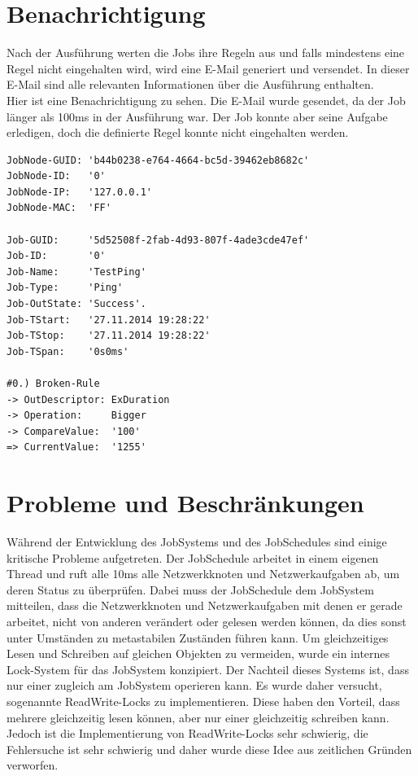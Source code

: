\documentclass[12pt,a4paper]{report}
\begin{document}
\begin{onehalfspace}
\section{Benachrichtigung}

Nach der Ausführung werten die Jobs ihre Regeln aus und falls mindestens eine Regel nicht eingehalten wird, wird eine E-Mail generiert und versendet. In dieser E-Mail sind alle relevanten Informationen über die Ausführung enthalten.\\ 
Hier ist eine Benachrichtigung zu sehen. Die E-Mail wurde gesendet, da der Job länger als 100ms in der Ausführung war. Der Job konnte aber seine Aufgabe erledigen, doch die definierte Regel konnte nicht eingehalten werden.\\

\begin{lstlisting}
JobNode-GUID: 'b44b0238-e764-4664-bc5d-39462eb8682c'
JobNode-ID:   '0'
JobNode-IP:   '127.0.0.1'
JobNode-MAC:  'FF'

Job-GUID:     '5d52508f-2fab-4d93-807f-4ade3cde47ef'
Job-ID:       '0'
Job-Name:     'TestPing'
Job-Type:     'Ping'
Job-OutState: 'Success'.
Job-TStart:   '27.11.2014 19:28:22'
Job-TStop:    '27.11.2014 19:28:22'
Job-TSpan:    '0s0ms'

#0.) Broken-Rule
-> OutDescriptor: ExDuration
-> Operation:     Bigger
-> CompareValue:  '100'
=> CurrentValue:  '1255'
\end{lstlisting}

\newpage
\section{Probleme und Beschränkungen}

Während der Entwicklung des JobSystems und des JobSchedules sind einige kritische Probleme aufgetreten. Der JobSchedule arbeitet in einem eigenen Thread und ruft alle 10ms alle Netzwerkknoten und Netzwerkaufgaben ab, um deren Status zu überprüfen. Dabei muss der JobSchedule dem JobSystem mitteilen, dass die Netzwerkknoten und Netzwerkaufgaben mit denen er gerade arbeitet, nicht von anderen verändert oder gelesen werden können, da dies sonst unter Umständen zu metastabilen Zuständen führen kann. Um gleichzeitiges Lesen und Schreiben auf gleichen Objekten zu vermeiden, wurde ein internes Lock-System für das JobSystem konzipiert. Der Nachteil dieses Systems ist, dass nur einer zugleich am JobSystem operieren kann. Es wurde daher versucht, sogenannte ReadWrite-Locks zu implementieren. Diese haben den Vorteil, dass mehrere gleichzeitig lesen können, aber nur einer gleichzeitig schreiben kann. Jedoch ist die Implementierung von ReadWrite-Locks sehr schwierig, die Fehlersuche ist sehr schwierig und daher wurde diese Idee aus zeitlichen Gründen verworfen.\\


\end{onehalfspace}
\end{document}
